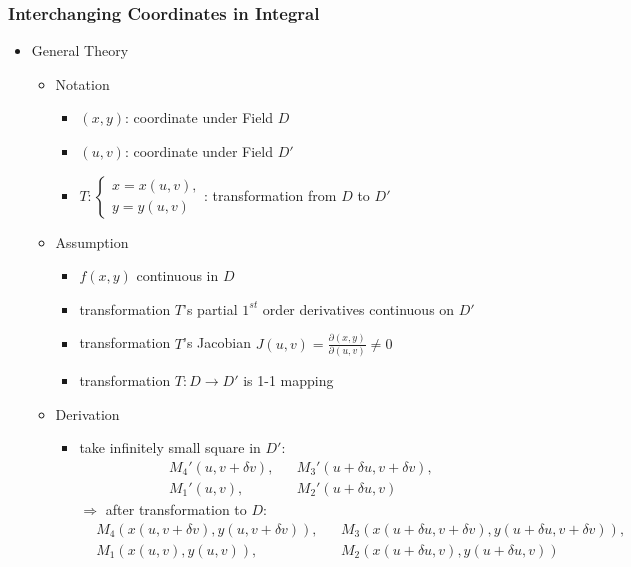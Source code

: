 \subsubsection{Interchanging Coordinates in Integral}
\begin{itemize}
\item General Theory
	\begin{itemize}
	\item Notation
		\begin{itemize}
		\item $(x,y)$: coordinate under Field $D$
		\item $(u,v)$: coordinate under Field $D'$
		\item $\displaystyle T: \begin{cases} x=x(u,v), \\ y=y(u,v) \end{cases}$: transformation from $D$ to $D'$
		\end{itemize} 
	\item Assumption
		\begin{itemize}
		\item $f(x,y)$ continuous in $D$
		\item transformation $T$'s partial $1^{st}$ order derivatives continuous on $D'$
		\item transformation $T$'s Jacobian $J(u,v) = \frac {\partial (x,y)}{\partial (u,v)} \neq 0$
		\item transformation $T: D\rightarrow D'$ is 1-1 mapping
		\end{itemize}
	\item Derivation
		\begin{itemize}
		\item take infinitely small square in $D':$
		\abovedisplayshortskip=0pt~\vspace*{-0.5\baselineskip}
		\begin{align*} &M_4'(u,v+\delta v),&&M_3'(u+\delta u, v+\delta v),\\&M_1'(u, v),&&M_2'(u+\delta u, v) \end{align*}
		$\Rightarrow$ after transformation to $D:$ 
		\abovedisplayshortskip=0pt~\vspace*{-0.5\baselineskip}
		\begin{align*} &M_4(x(u,v+\delta v),y(u,v+\delta v)),&&M_3(x(u+\delta u, v+\delta v),y(u+\delta u, v+\delta v)),\\&M_1(x(u, v),y(u, v)),&&M_2(x(u+\delta u, v),y(u+\delta u, v)) \end{align*}
		\abovedisplayshortskip=0pt~\vspace*{-1.5\baselineskip}

\end{itemize}
\end{itemize}
\end{itemize}
